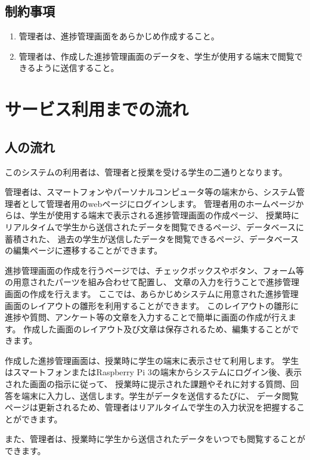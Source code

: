 \documentclass[a4j,titlepage]{ujarticle}
\begin{document}
\subsection{制約事項}
\begin{enumerate}[(1)]
\item 管理者は、進捗管理画面をあらかじめ作成すること。
\item 管理者は、作成した進捗管理画面のデータを、学生が使用する端末で閲覧できるように送信すること。
\end{enumerate}

\section{サービス利用までの流れ}
\subsection{人の流れ}
このシステムの利用者は、管理者と授業を受ける学生の二通りとなります。

管理者は、スマートフォンやパーソナルコンピュータ等の端末から、システム管理者として管理者用のwebページにログインします。
管理者用のホームページからは、学生が使用する端末で表示される進捗管理画面の作成ページ、
授業時にリアルタイムで学生から送信されたデータを閲覧できるページ、データベースに蓄積された、
過去の学生が送信したデータを閲覧できるページ、データベースの編集ページに遷移することができます。

進捗管理画面の作成を行うページでは、チェックボックスやボタン、フォーム等の用意されたパーツを組み合わせて配置し、
文章の入力を行うことで進捗管理画面の作成を行えます。
ここでは、あらかじめシステムに用意された進捗管理画面のレイアウトの雛形を利用することができます。
このレイアウトの雛形に進捗や質問、アンケート等の文章を入力することで簡単に画面の作成が行えます。
作成した画面のレイアウト及び文章は保存されるため、編集することができます。

作成した進捗管理画面は、授業時に学生の端末に表示させて利用します。
学生はスマートフォンまたはRaspberry Pi 3の端末からシステムにログイン後、表示された画面の指示に従って、
授業時に提示された課題やそれに対する質問、回答を端末に入力し、送信します。学生がデータを送信するたびに、
データ閲覧ページは更新されるため、管理者はリアルタイムで学生の入力状況を把握することができます。

また、管理者は、授業時に学生から送信されたデータをいつでも閲覧することができます。
\end{document}
